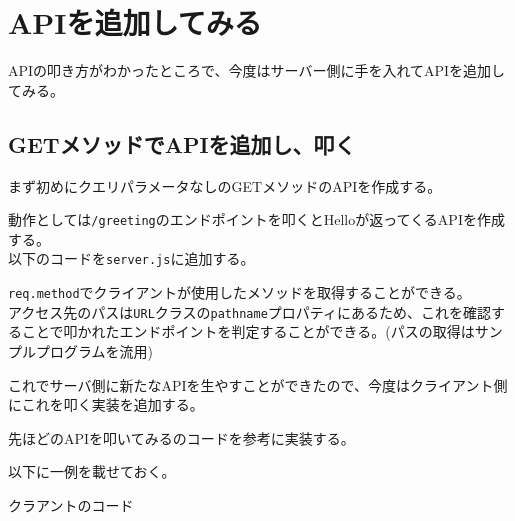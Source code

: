 \section{APIを追加してみる}\label{apiux3092ux8ffdux52a0ux3057ux3066ux307fux308b}

APIの叩き方がわかったところで、今度はサーバー側に手を入れてAPIを追加してみる。

\subsection{GETメソッドでAPIを追加し、叩く}\label{getux30e1ux30bdux30c3ux30c9ux3067apiux3092ux8ffdux52a0ux3057ux53e9ux304f}

まず初めにクエリパラメータなしのGETメソッドのAPIを作成する。

動作としては\texttt{/greeting}のエンドポイントを叩くとHelloが返ってくるAPIを作成する。\\
以下のコードを\texttt{server.js}に追加する。

\begin{Shaded}
\begin{Highlighting}[]

   \OperatorTok{===}  \OperatorTok{\&\&}\OperatorTok{===} \NormalTok{ )\{}
      \NormalTok{(}\NormalTok{)}
\NormalTok{  \}}
\end{Highlighting}
\end{Shaded}

\texttt{req.method}でクライアントが使用したメソッドを取得することができる。\\
アクセス先のパスは\texttt{URL}クラスの\texttt{pathname}プロパティにあるため、これを確認することで叩かれたエンドポイントを判定することができる。(パスの取得はサンプルプログラムを流用)

これでサーバ側に新たなAPIを生やすことができたので、今度はクライアント側にこれを叩く実装を追加する。

先ほどのAPIを叩いてみるのコードを参考に実装する。

以下に一例を載せておく。

クラアントのコード

